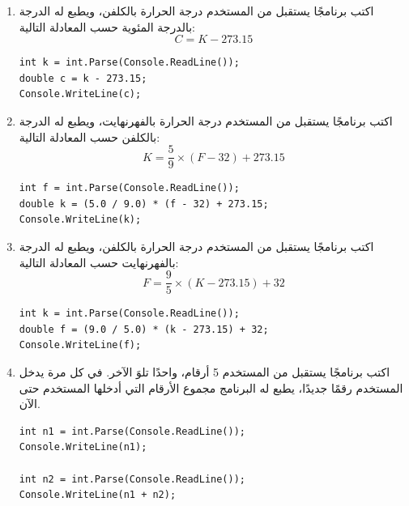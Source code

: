 \documentclass[14pt]{extarticle}
\begin{document}
\begin{enumerate}[itemsep=2em]
\item
اكتب برنامجًا يستقبل من المستخدم درجة الحرارة بالكلفن، ويطبع له الدرجة بالدرجة المئوية حسب المعادلة التالية:
$$ C = K - 273.15 $$
\ifwithsols
\begin{boxSolution}
\begin{english}
\begin{verbatim}
int k = int.Parse(Console.ReadLine());
double c = k - 273.15;
Console.WriteLine(c);
\end{verbatim}
\end{english}
\end{boxSolution}
\fi

\item
اكتب برنامجًا يستقبل من المستخدم درجة الحرارة بالفهرنهايت، ويطبع له الدرجة بالكلفن حسب المعادلة التالية:
$$ K = \frac{5}{9} \times (F - 32) + 273.15 $$
\ifwithsols
\begin{boxSolution}
\begin{english}
\begin{verbatim}
int f = int.Parse(Console.ReadLine());
double k = (5.0 / 9.0) * (f - 32) + 273.15;
Console.WriteLine(k);
\end{verbatim}
\end{english}
\end{boxSolution}
\fi

\item
اكتب برنامجًا يستقبل من المستخدم درجة الحرارة بالكلفن، ويطبع له الدرجة بالفهرنهايت حسب المعادلة التالية:
$$ F = \frac{9}{5} \times (K - 273.15) + 32 $$
\ifwithsols
\begin{boxSolution}
\begin{english}
\begin{verbatim}
int k = int.Parse(Console.ReadLine());
double f = (9.0 / 5.0) * (k - 273.15) + 32;
Console.WriteLine(f);
\end{verbatim}
\end{english}
\end{boxSolution}
\clearpage
\fi

\item
اكتب برنامجًا يستقبل من المستخدم 5 أرقام، واحدًا تلوَ الآخر. في كل مرة يدخل المستخدم رقمًا جديدًا، يطبع له البرنامج مجموع الأرقام التي أدخلها المستخدم حتى الآن.
\ifwithsols
\begin{boxSolution}
\begin{english}
\begin{verbatim}
int n1 = int.Parse(Console.ReadLine());
Console.WriteLine(n1);

int n2 = int.Parse(Console.ReadLine());
Console.WriteLine(n1 + n2);


\end{verbatim}
\end{english}
\end{boxSolution}
\end{enumerate}
\end{document}
